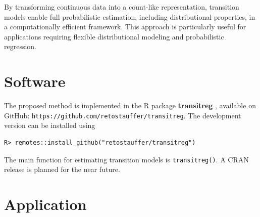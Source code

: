 \documentclass[english,a4paper,11pt]{article}
\begin{document}
By transforming continuous data into a count-like representation, transition models enable
full probabilistic estimation, including distributional properties, in a computationally
efficient framework. This approach is particularly useful for applications requiring flexible
distributional modeling and probabilistic regression.

\section{Software} \label{sec:software}

The proposed method is implemented in the \textsf{R} package \textbf{transitreg} \cite{transitreg},
available on GitHub: \texttt{https://github.com/retostauffer/transitreg}. The development version
can be installed using
\begin{verbatim}
R> remotes::install_github("retostauffer/transitreg")
\end{verbatim}  
The main function for estimating transition models is \texttt{transitreg()}. A CRAN release is
planned for the near future.

\section{Application} \label{sec:application}
\end{document}
